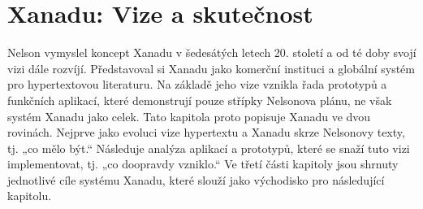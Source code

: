 \chapter{Xanadu: Vize a skutečnost}



Nelson vymyslel koncept Xanadu v šedesátých letech 20. století a od té doby svojí vizi dále rozvíjí. Představoval si Xanadu jako komerční instituci a globální systém pro hypertextovou literaturu. Na základě jeho vize vznikla řada prototypů a funkčních aplikací, které demonstrují pouze střípky Nelsonova plánu, ne však systém Xanadu jako celek. Tato kapitola proto popisuje Xanadu ve dvou rovinách. Nejprve jako evoluci vize hypertextu a Xanadu skrze Nelsonovy texty, tj. „co mělo být.“ Následuje analýza aplikací a prototypů, které se snaží tuto vizi implementovat, tj. „co doopravdy vzniklo.“ Ve třetí části kapitoly jsou shrnuty jednotlivé cíle systému Xanadu, které slouží jako východisko pro následující kapitolu.

